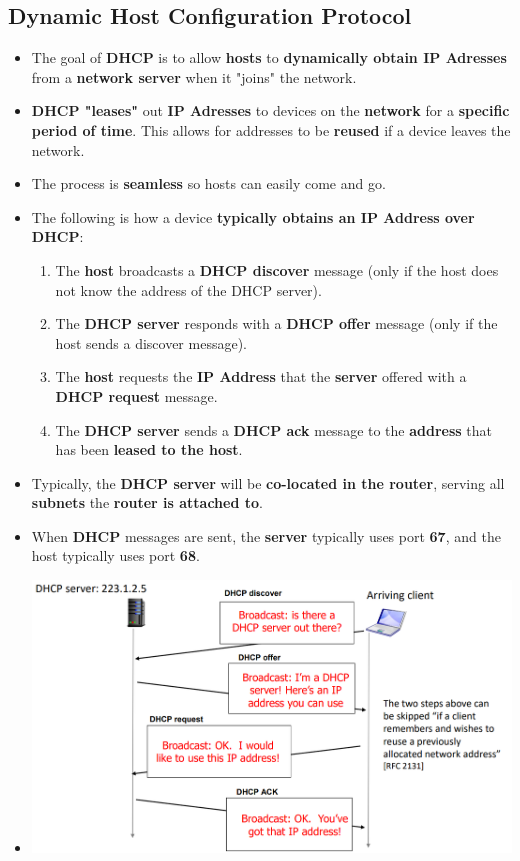 \documentclass{article}
\begin{document}
    \subsection*{Dynamic Host Configuration Protocol}
    \begin{itemize}
        \item The goal of \textbf{DHCP} is to allow \textbf{hosts} to \textbf{dynamically obtain IP Adresses} from a \textbf{network server} when it "joins" the network.
        \item \textbf{DHCP "leases"} out \textbf{IP Adresses} to devices on the \textbf{network} for a \textbf{specific period of time}. This allows for addresses to be \textbf{reused} if a device leaves the network.
        \item The process is \textbf{seamless} so hosts can easily come and go.
        \item The following is how a device \textbf{typically obtains an IP Address over DHCP}:
        \begin{enumerate}
            \item The \textbf{host} broadcasts a \textbf{DHCP discover} message (only if the host does not know the address of the DHCP server).
            \item The \textbf{DHCP server} responds with a \textbf{DHCP offer} message (only if the host sends a discover message).
            \item The \textbf{host} requests the \textbf{IP Address} that the \textbf{server} offered with a \textbf{DHCP request} message.
            \item The \textbf{DHCP server} sends a \textbf{DHCP ack} message to the \textbf{address} that has been \textbf{leased to the host}.
        \end{enumerate}
        \item Typically, the \textbf{DHCP server} will be \textbf{co-located in the router}, serving all \textbf{subnets} the \textbf{router is attached to}.
        \item When \textbf{DHCP} messages are sent, the \textbf{server} typically uses port \textbf{67}, and the host typically uses port \textbf{68}.
        \item[] \includegraphics*[width=\textwidth - 25pt]{images/DHCP-Request.PNG}

\end{itemize}
\end{document}
